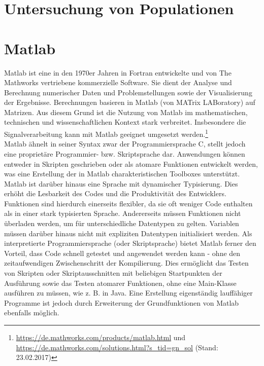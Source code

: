 \section{Untersuchung von Populationen}

\section{Matlab}

Matlab ist eine in den 1970er Jahren in Fortran entwickelte und von The Mathworks vertriebene kommerzielle Software. Sie dient der Analyse und Berechnung numerischer Daten und Problemstellungen sowie der Visualisierung der Ergebnisse. Berechnungen basieren in Matlab (von MATrix LABoratory) auf Matrizen. Aus diesem Grund ist die Nutzung von Matlab im mathematischen, technischen und wissenschaftlichen Kontext stark verbreitet. Insbesondere die Signalverarbeitung kann mit Matlab geeignet umgesetzt werden.\footnote{\url{https://de.mathworks.com/products/matlab.html} und \url{https://de.mathworks.com/solutions.html?s_tid=gn_sol} (Stand: 23.02.2017)}\\

Matlab ähnelt in seiner Syntax zwar der Programmiersprache C, stellt jedoch eine proprietäre Programmier- bzw. Skriptsprache dar. Anwendungen können entweder in Skripten geschrieben oder als atomare Funktionen entwickelt werden, was eine Erstellung der in Matlab charakteristischen Toolboxes unterstützt. Matlab ist darüber hinaus eine Sprache mit dynamischer Typisierung. Dies erhöht die Lesbarkeit des Codes und die Produktivität des Entwicklers. Funktionen sind hierdurch einerseits flexibler, da sie oft weniger Code enthalten als in einer stark typisierten Sprache. Andererseits müssen Funktionen nicht überladen werden, um für unterschiedliche Datentypen zu gelten. Variablen müssen darüber hinaus nicht mit expliziten Datentypen initialisiert werden. Als interpretierte Programmiersprache (oder Skriptsprache) bietet Matlab ferner den Vorteil, dass Code schnell getestet und angewendet werden kann - ohne den zeitaufwendigen Zwischenschritt der Kompilierung. Dies ermöglicht das Testen von Skripten oder Skriptausschnitten mit beliebigen Startpunkten der Ausführung sowie das Testen atomarer Funktionen, ohne eine Main-Klasse ausführen zu müssen, wie z. B. in Java. Eine Erstellung eigenständig lauffähiger Programme ist jedoch durch Erweiterung der Grundfunktionen von Matlab ebenfalls möglich. \parencite{stein_programmieren_2012}\\

